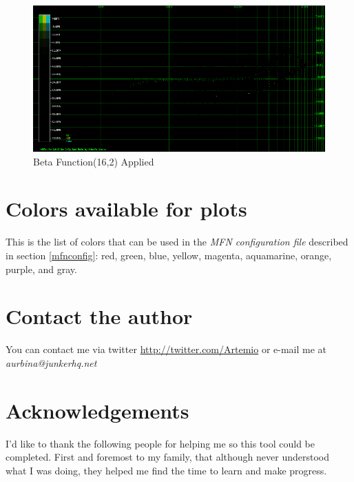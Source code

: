 \documentclass[10pt,a4paper]{report}
\begin{document}
\begin{appendices}
\begin{figure}[H]
	\centering
	\includegraphics[width=1\linewidth]{plots/BetaFunctionPlot_5_Data.png}
	\caption[Beta Function(16,2)]{Beta Function(16,2) Applied}
	\label{fig:betafunctionplot5data}
\end{figure}

\chapter{Colors available for plots}
\label{availablecolors}

This is the list of colors that can be used in the \textit{MFN configuration file} described in section \ref{mfnconfig}: red, green, blue, yellow, magenta, aquamarine, orange, purple, and gray.

\chapter{Contact the author}
\label{contact}

You can contact me via twitter \url{http://twitter.com/Artemio} or e-mail me at \textit{aurbina@junkerhq.net}

\chapter{Acknowledgements}

I'd like to thank the following people for helping me so this tool could be completed. First and foremost to my family, that although never understood what I was doing, they helped me find the time to learn and make progress.

\end{appendices}
\end{document}

